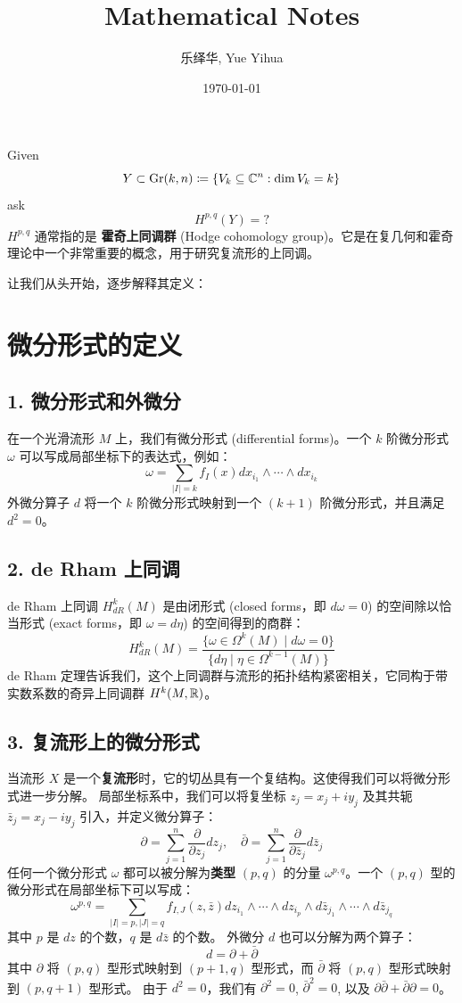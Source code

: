 \documentclass{amsart}
\author{乐绎华, Yue Yihua}
\date{\today}
\title{Mathematical Notes}
\let\originalmathbb\mathbb
\renewcommand{\mathbb}[1]{%
    \ifstrequal{#1}{1}{\mathbbm{#1}}{\originalmathbb{#1}}%
}
\theoremstyle{plain}
\theoremstyle{definition}
\theoremstyle{remark}
\begin{document}
\maketitle
\tableofcontents

Given
\[
Y\subset\text{Gr}(k,n)\coloneqq \{ V_k\subseteq \mathbb{C}^{n}:\dim V_k=k \}
\]
ask
\[
H^{p,q}(Y)=?
\]
$H^{p,q}$ 通常指的是 \textbf{霍奇上同调群} (Hodge cohomology group)。它是在复几何和霍奇理论中一个非常重要的概念，用于研究复流形的上同调。

让我们从头开始，逐步解释其定义：

\section{微分形式的定义}

\subsection{1. 微分形式和外微分}

在一个光滑流形 $M$ 上，我们有微分形式 (differential forms)。一个 $k$ 阶微分形式 $\omega$ 可以写成局部坐标下的表达式，例如：
\[
\omega = \sum_{|I|=k} f_I(x) dx_{i_1} \wedge \cdots \wedge dx_{i_k}
\]
外微分算子 $d$ 将一个 $k$ 阶微分形式映射到一个 $(k+1)$ 阶微分形式，并且满足 $d^2 = 0$。

\subsection{2. de Rham 上同调}

de Rham 上同调 $H^k_{dR}(M)$ 是由闭形式 (closed forms，即 $d\omega = 0$) 的空间除以恰当形式 (exact forms，即 $\omega = d\eta$) 的空间得到的商群：
\[
H^k_{dR}(M) = \frac{\{\omega \in \Omega^k(M) \mid d\omega = 0\}}{\{d\eta \mid \eta \in \Omega^{k-1}(M)\}}
\]
de Rham 定理告诉我们，这个上同调群与流形的拓扑结构紧密相关，它同构于带实数系数的奇异上同调群 $H^k(M, \mathbb{R})$。

\subsection{3. 复流形上的微分形式}

当流形 $X$ 是一个\textbf{复流形}时，它的切丛具有一个复结构。这使得我们可以将微分形式进一步分解。
局部坐标系中，我们可以将复坐标 $z_j = x_j + i y_j$ 及其共轭 $\bar{z}_j = x_j - i y_j$ 引入，并定义微分算子：
\[
\partial = \sum_{j=1}^n \frac{\partial}{\partial z_j} dz_j, \quad \bar{\partial} = \sum_{j=1}^n \frac{\partial}{\partial \bar{z}_j} d\bar{z}_j
\]
任何一个微分形式 $\omega$ 都可以被分解为\textbf{类型} $(p,q)$ 的分量 $\omega^{p,q}$。一个 $(p,q)$ 型的微分形式在局部坐标下可以写成：
\[
\omega^{p,q} = \sum_{|I|=p, |J|=q} f_{I,J}(z, \bar{z}) dz_{i_1} \wedge \cdots \wedge dz_{i_p} \wedge d\bar{z}_{j_1} \wedge \cdots \wedge d\bar{z}_{j_q}
\]
其中 $p$ 是 $dz$ 的个数，$q$ 是 $d\bar{z}$ 的个数。
外微分 $d$ 也可以分解为两个算子：
\[
d = \partial + \bar{\partial}
\]
其中 $\partial$ 将 $(p,q)$ 型形式映射到 $(p+1,q)$ 型形式，而 $\bar{\partial}$ 将 $(p,q)$ 型形式映射到 $(p,q+1)$ 型形式。
由于 $d^2 = 0$，我们有 $\partial^2 = 0$, $\bar{\partial}^2 = 0$, 以及 $\partial\bar{\partial} + \bar{\partial}\partial = 0$。
\end{document}
